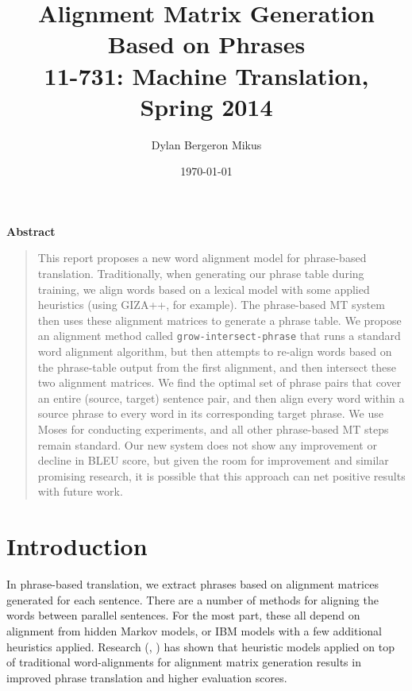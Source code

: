 \documentclass[twocolumn]{article}
\title{Alignment Matrix Generation Based on Phrases \\
  11-731: Machine Translation, Spring 2014}
\date{\today}
\author{Dylan Bergeron Mikus}
\newcommand{\phraseIntersectAlign}{\texttt{grow-intersect-phrase}}
\begin{document}
\maketitle{}

\begin{center}
\Large{\textbf{Abstract}}
\end{center}
\begin{quotation}
  \small{
    This report proposes a new word alignment model for phrase-based
    translation. Traditionally, when generating our phrase table during
    training, we align words based on a lexical model with some applied
    heuristics (using GIZA++, for example). The phrase-based MT system then uses
    these alignment matrices to generate a phrase table.
    We propose an alignment method called \phraseIntersectAlign{} that runs a
    standard word alignment algorithm, but then attempts to re-align words based
    on the phrase-table output from the first alignment, and then intersect
    these two alignment matrices. We find the optimal set of phrase pairs that
    cover an entire (source, target) sentence pair, and then align every word
    within a source phrase to every word in its corresponding target phrase.
    We use Moses for conducting experiments, and all other phrase-based MT steps
    remain standard. Our new system does not show any improvement or decline in
    BLEU score, but given the room for improvement and similar promising
    research, it is possible that this approach can net positive results with
    future work.
  }
\end{quotation}


\section{Introduction}
In phrase-based translation, we extract phrases based on alignment matrices
generated for each sentence. There are a number of methods for aligning the
words between parallel sentences. For the most part, these all depend on
alignment from hidden Markov models, or IBM models with a few additional
heuristics applied. Research (\cite{wuwang2007}, \cite{dgzk2006}) has shown that
heuristic models applied on top of traditional word-alignments for alignment
matrix generation results in improved phrase translation and higher evaluation
scores.
\end{document}
